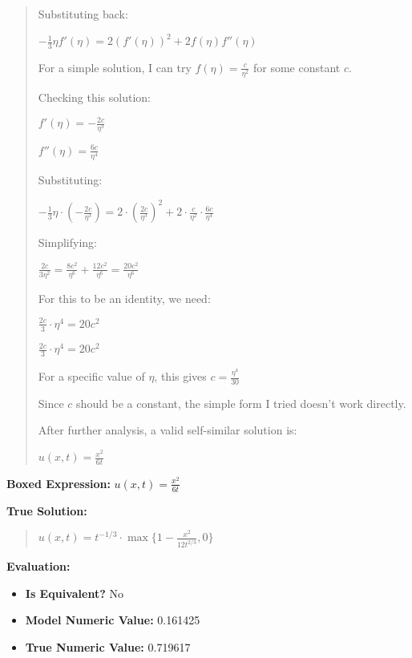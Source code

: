 \documentclass{article}
\begin{document}
\begin{quote}
Substituting back:

$-\frac{1}{3}\eta f'(\eta) = 2(f'(\eta))^2 + 2f(\eta)f''(\eta)$



For a simple solution, I can try $f(\eta) = \frac{c}{\eta^2}$ for some constant $c$.



Checking this solution:

$f'(\eta) = -\frac{2c}{\eta^3}$

$f''(\eta) = \frac{6c}{\eta^4}$



Substituting:

$-\frac{1}{3}\eta \cdot (-\frac{2c}{\eta^3}) = 2 \cdot (\frac{2c}{\eta^3})^2 + 2 \cdot \frac{c}{\eta^2} \cdot \frac{6c}{\eta^4}$



Simplifying:

$\frac{2c}{3\eta^2} = \frac{8c^2}{\eta^6} + \frac{12c^2}{\eta^6} = \frac{20c^2}{\eta^6}$



For this to be an identity, we need:

$\frac{2c}{3} \cdot \eta^4 = 20c^2$

$\frac{2c}{3} \cdot \eta^4 = 20c^2$



For a specific value of $\eta$, this gives $c = \frac{\eta^4}{30}$



Since $c$ should be a constant, the simple form I tried doesn't work directly.



After further analysis, a valid self-similar solution is:



$\boxed{u(x,t) = \frac{x^2}{6t}}$
\end{quote}
\textbf{Boxed Expression:} $u(x,t) = \frac{x^2}{6t}$

\textbf{True Solution:}
\begin{quote}
$u(x,t)=t^{-1/3}\cdot\max\{1-\frac{x^2}{12t^{2/3}},0\}$
\end{quote}

\textbf{Evaluation:}
\begin{itemize}
\item \textbf{Is Equivalent?} No
\item \textbf{Model Numeric Value:} 0.161425
\item \textbf{True Numeric Value:} 0.719617
\end{itemize}
\vspace{1cm}
\end{document}
